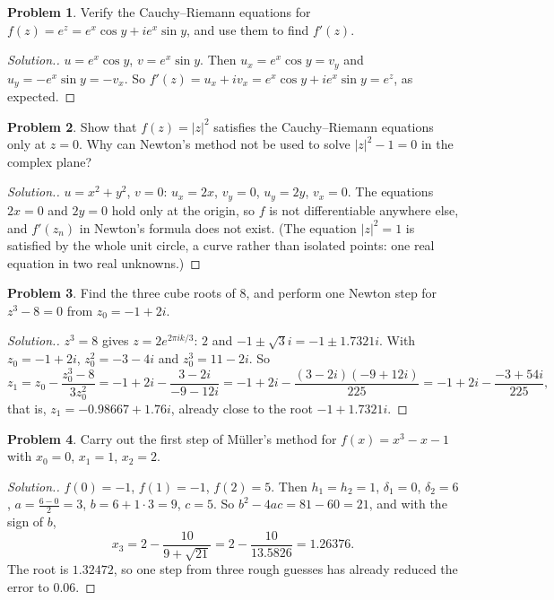 \documentclass[11pt,a4paper]{article}
\numberwithin{equation}{section}
\theoremstyle{definition}
\newtheorem{problemx}{Problem}[subsection]
\newenvironment{problem}{\begin{problemx}}{\end{problemx}}
\newenvironment{solution}
  {\renewcommand{\qedsymbol}{}\begin{proof}[\textit{Solution}.]}
  {\end{proof}}
\begin{document}
\begin{problem}
Verify the Cauchy--Riemann equations for $f(z) = e^z = e^x\cos y+ie^x\sin y$, and use them to find $f'(z)$.
\end{problem}
\begin{solution}
$u = e^x\cos y$, $v = e^x\sin y$. Then $u_x = e^x\cos y = v_y$ and $u_y = -e^x\sin y = -v_x$. So $f'(z) = u_x+iv_x = e^x\cos y+ie^x\sin y =
e^z$, as expected.
\end{solution}

\begin{problem}
Show that $f(z) = |z|^2$ satisfies the Cauchy--Riemann equations only at $z = 0$. Why can Newton's method not be used to solve
$|z|^2-1 = 0$ in the complex plane?
\end{problem}
\begin{solution}
$u = x^2+y^2$, $v = 0$: $u_x = 2x$, $v_y = 0$, $u_y = 2y$, $v_x = 0$. The equations $2x = 0$ and $2y = 0$ hold only at the origin, so $f$ is
not differentiable anywhere else, and $f'(z_n)$ in Newton's formula does not exist. (The equation $|z|^2 = 1$ is satisfied by the whole unit
circle, a curve rather than isolated points: one real equation in two real unknowns.)
\end{solution}

\begin{problem}
Find the three cube roots of $8$, and perform one Newton step for $z^3-8 = 0$ from $z_0 = -1+2i$.
\end{problem}
\begin{solution}
$z^3 = 8$ gives $z = 2e^{2\pi ik/3}$: $2$ and $-1\pm\sqrt3i = -1\pm1.7321i$. With $z_0 = -1+2i$, $z_0^2 = -3-4i$ and $z_0^3 = 11-2i$. So
$$z_1 = z_0-\frac{z_0^3-8}{3z_0^2} = -1+2i-\frac{3-2i}{-9-12i} = -1+2i-\frac{(3-2i)(-9+12i)}{225} = -1+2i-\frac{-3+54i}{225},$$
that is, $z_1 = -0.98667+1.76i$, already close to the root $-1+1.7321i$.
\end{solution}

\begin{problem}
Carry out the first step of M\"uller's method for $f(x) = x^3-x-1$ with $x_0 = 0$, $x_1 = 1$, $x_2 = 2$.
\end{problem}
\begin{solution}
$f(0) = -1$, $f(1) = -1$, $f(2) = 5$. Then $h_1 = h_2 = 1$, $\delta_1 = 0$, $\delta_2 = 6$, $a = \frac{6-0}{2} = 3$, $b = 6+1\cdot3 = 9$, $c = 5$.
So $b^2-4ac = 81-60 = 21$, and with the sign of $b$,
$$x_3 = 2-\frac{10}{9+\sqrt{21}} = 2-\frac{10}{13.5826} = 1.26376 .$$
The root is $1.32472$, so one step from three rough guesses has already reduced the error to $0.06$.
\end{solution}
\end{document}
